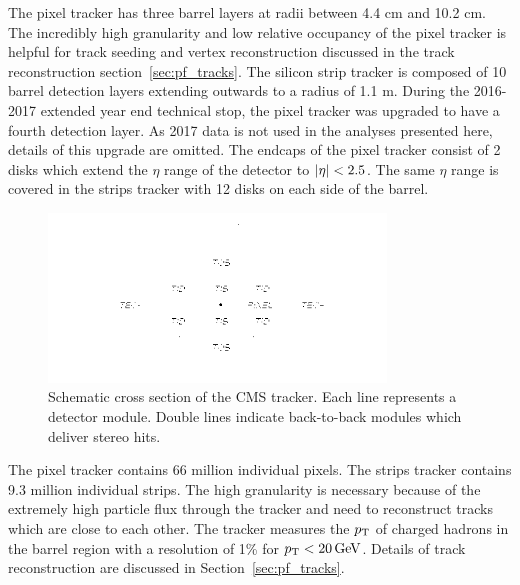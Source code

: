 The pixel tracker has three barrel layers at radii between 4.4 cm and 10.2 cm. The
incredibly high granularity and low relative occupancy of the pixel tracker 
is helpful for track seeding and vertex
reconstruction discussed in the track reconstruction section~\ref{sec:pf_tracks}.
The silicon strip tracker is composed of 10 barrel detection layers extending 
outwards to a radius of 1.1 m. During the 2016-2017 extended year end technical stop,
the pixel tracker was upgraded to have a fourth detection layer. As 2017 data is not used
in the analyses presented here, details of this upgrade are omitted.
The endcaps of the pixel tracker consist of 2 disks which extend the $\eta$ 
range of the detector to $\lvert\eta\rvert < 2.5$. The same $\eta$ range is covered in the
strips tracker with 12 disks on each side of the barrel.

\begin{figure}[htbp]
\centering
     \includegraphics[width=0.8\textwidth]{cms_and_lhc/plots/cms_tracker.png}
     \caption{
Schematic cross section of the CMS tracker. Each line represents a detector module. 
Double lines indicate back-to-back modules which deliver stereo hits.
     }
     \label{fig:cms_tracker}
\end{figure}

The pixel tracker contains 66 million individual pixels. The strips tracker
contains 9.3 million individual strips. The high granularity is necessary
because of the extremely high particle flux through the tracker and need to
reconstruct tracks which are close to each other.
The tracker measures the $p_\mathrm{T}$ of 
charged hadrons in the barrel region with a resolution of 1\% for $p_\mathrm{T} < 20\,\mathrm{GeV}$.
Details of track reconstruction are discussed in Section~\ref{sec:pf_tracks}.

